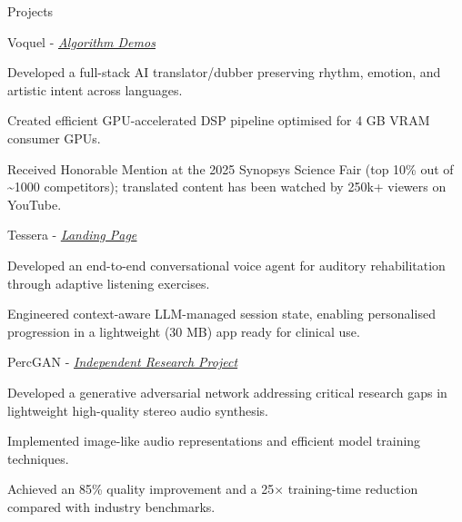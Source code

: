 \documentclass[
  10pt, %
]{resume}
\begin{document}
\begin{rSection}{Projects}

  
    \begin{rSubsection}{Voquel - \textit{\underline{\href{https://www.youtube.com/@translateanyaudio}{Algorithm Demos}}}}{}{}{}
        
      \item Developed a full-stack AI translator/dubber preserving rhythm, emotion, and artistic intent across languages.
          
      \item Created efficient GPU-accelerated DSP pipeline optimised for 4 GB VRAM consumer GPUs.
          
      \item Received Honorable Mention at the 2025 Synopsys Science Fair (top 10\% out of \textasciitilde{}1000 competitors); translated content has been watched by 250k+ viewers on YouTube.
          
    \end{rSubsection}
        
    \begin{rSubsection}{Tessera - \textit{\underline{\href{https://shuklabhay.github.io/tessera/}{Landing Page}}}}{}{}{}
        
      \item Developed an end-to-end conversational voice agent for auditory rehabilitation through adaptive listening exercises.
          
      \item Engineered context-aware LLM-managed session state, enabling personalised progression in a lightweight (30 MB) app ready for clinical use.
          
    \end{rSubsection}
        
    \begin{rSubsection}{PercGAN - \textit{\underline{\href{https://github.com/shuklabhay/percgan}{Independent Research Project}}}}{}{}{}
        
      \item Developed a generative adversarial network addressing critical research gaps in lightweight high-quality stereo audio synthesis.
          
      \item Implemented image-like audio representations and efficient model training techniques.
          
      \item Achieved an 85\% quality improvement and a 25× training-time reduction compared with industry benchmarks.
          

\end{rSubsection}
\end{rSection}
\end{document}
